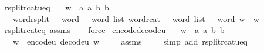 \begin{isabellebody}
\endisatagproof
{\isafoldproof}%
%
\isadelimproof
\isanewline
%
\endisadelimproof
\isanewline
{}\isamarkupfalse%
\ rsplit{\isacharunderscore}{\kern0pt}rcat{\isacharunderscore}{\kern0pt}u{}{}{\isacharunderscore}{\kern0pt}eq{\isacharcolon}{\kern0pt}\isanewline
\ \ \ {\isachardoublequoteopen}w\ {\isacharequal}{\kern0pt}\ {\isacharbrackleft}{\kern0pt}a{}{\isacharcomma}{\kern0pt}\ a{}{\isacharcomma}{\kern0pt}\ b{}{\isacharcomma}{\kern0pt}\ b{}{\isacharbrackright}{\kern0pt}{\isachardoublequoteclose}\isanewline
\ \ \ {\isachardoublequoteopen}{\isacharparenleft}{\kern0pt}word{\isacharunderscore}{\kern0pt}rsplit\ {\isacharcolon}{\kern0pt}{\isacharcolon}{\kern0pt}\ {}{}\ word\ {\isasymRightarrow}\ {}\ word\ list{\isacharparenright}{\kern0pt}\ {\isacharparenleft}{\kern0pt}{\isacharparenleft}{\kern0pt}word{\isacharunderscore}{\kern0pt}rcat\ {\isacharcolon}{\kern0pt}{\isacharcolon}{\kern0pt}\ {}\ word\ list\ {\isasymRightarrow}\ {}{}\ word{\isacharparenright}{\kern0pt}\ w{\isacharparenright}{\kern0pt}\ {\isacharequal}{\kern0pt}\ w{\isachardoublequoteclose}\ \isanewline
%
\isadelimproof
\ \ %
\endisadelimproof
%
\isatagproof
{}\isamarkupfalse%
\ rsplit{\isacharunderscore}{\kern0pt}rcat{\isacharunderscore}{\kern0pt}eq\ assms\isanewline
\ \ \isamarkupfalse%
\ force%
\endisatagproof
{\isafoldproof}%
%
\isadelimproof
\isanewline
%
\endisadelimproof
\isanewline
{}\isamarkupfalse%
\ encode{\isacharunderscore}{\kern0pt}decode{\isacharunderscore}{\kern0pt}u{}{}{\isacharcolon}{\kern0pt}\isanewline
\ \ \ {\isachardoublequoteopen}w\ {\isacharequal}{\kern0pt}\ {\isacharbrackleft}{\kern0pt}a{}{\isacharcomma}{\kern0pt}\ a{}{\isacharcomma}{\kern0pt}\ b{}{\isacharcomma}{\kern0pt}\ b{}{\isacharbrackright}{\kern0pt}{\isachardoublequoteclose}\isanewline
\ \ \ {\isachardoublequoteopen}w\ {\isacharequal}{\kern0pt}\ encode{\isacharunderscore}{\kern0pt}u{}{}\ {\isacharparenleft}{\kern0pt}decode{\isacharunderscore}{\kern0pt}u{}{}\ w{\isacharparenright}{\kern0pt}{\isachardoublequoteclose}\ \isanewline
%
\isadelimproof
\ \ %
\endisadelimproof
%
\isatagproof
{}\isamarkupfalse%
\ assms\ \isanewline
\ \ \isamarkupfalse%
\ {\isacharparenleft}{\kern0pt}simp\ add{\isacharcolon}{\kern0pt}\ rsplit{\isacharunderscore}{\kern0pt}rcat{\isacharunderscore}{\kern0pt}u{}{}{\isacharunderscore}{\kern0pt}eq{\isacharparenright}{\kern0pt}%

\end{isabellebody}

